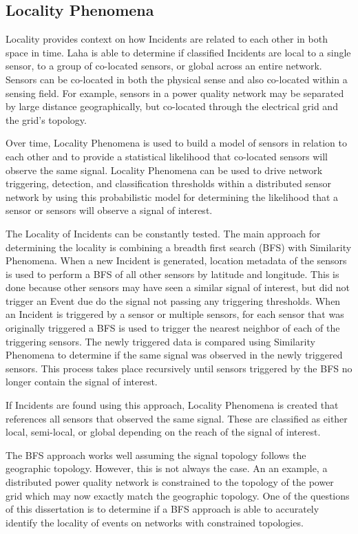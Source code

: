 \subsection{Locality Phenomena}\label{subsec:locality-phenomena}
Locality provides context on how Incidents are related to each other in both space in time. Laha is able to determine if classified Incidents are local to a single sensor, to a group of co-located sensors, or global across an entire network. Sensors can be co-located in both the physical sense and also co-located within a sensing field. For example, sensors in a power quality network may be separated by large distance geographically, but co-located through the electrical grid and the grid's topology.

Over time, Locality Phenomena is used to build a model of sensors in relation to each other and to provide a statistical likelihood that co-located sensors will observe the same signal. Locality Phenomena can be used to drive network triggering, detection, and classification thresholds within a distributed sensor network by using this probabilistic model for determining the likelihood that a sensor or sensors will observe a signal of interest.

The Locality of Incidents can be constantly tested. The main approach for determining the locality is combining a breadth first search (BFS) with Similarity Phenomena. When a new Incident is generated, location metadata of the sensors is used to perform a BFS of all other sensors by latitude and longitude. This is done because other sensors may have seen a similar signal of interest, but did not trigger an Event due do the signal not passing any triggering thresholds. When an Incident is triggered by a sensor or multiple sensors, for each sensor that was originally triggered a BFS is used to trigger the nearest neighbor of each of the triggering sensors. The newly triggered data is compared using Similarity Phenomena to determine if the same signal was observed in the newly triggered sensors. This process takes place recursively until sensors triggered by the BFS no longer contain the signal of interest.

If Incidents are found using this approach, Locality Phenomena is created that references all sensors that observed the same signal. These are classified as either local, semi-local, or global depending on the reach of the signal of interest.

The BFS approach works well assuming the signal topology follows the geographic topology. However, this is not always the case. An an example, a distributed power quality network is constrained to the topology of the power grid which may now exactly match the geographic topology. One of the questions of this dissertation is to determine if a BFS approach is able to accurately identify the locality of events on networks with constrained topologies.


